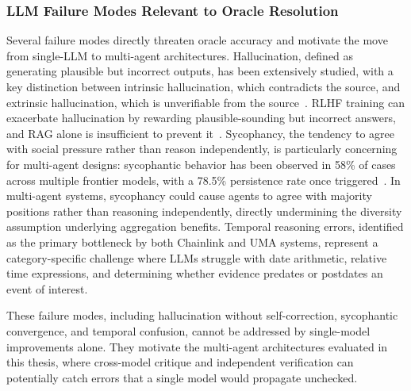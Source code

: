 \subsubsection{LLM Failure Modes Relevant to Oracle Resolution}

Several failure modes directly threaten oracle accuracy and motivate the 
move from single-LLM to multi-agent architectures. Hallucination, 
defined as generating plausible but incorrect outputs, has been extensively 
studied, with a key distinction between intrinsic hallucination, which 
contradicts the source, and extrinsic hallucination, which is unverifiable 
from the source~\cite{ji2023hallucination}. RLHF training can exacerbate 
hallucination by rewarding plausible-sounding but incorrect answers, and 
RAG alone is insufficient to prevent it~\cite{huang2025hallucination}. 
Sycophancy, the tendency to agree with social pressure rather than 
reason independently, is particularly concerning for multi-agent designs: 
sycophantic behavior has been observed in 58\% of cases across multiple 
frontier models, with a 78.5\% persistence rate once 
triggered~\cite{fanous2025sycophancy}. In multi-agent systems, sycophancy 
could cause agents to agree with majority positions rather than reasoning 
independently, directly undermining the diversity assumption underlying 
aggregation benefits. Temporal reasoning errors, identified as the 
primary bottleneck by both Chainlink and UMA systems, represent a 
category-specific challenge where LLMs struggle with date arithmetic, 
relative time expressions, and determining whether evidence predates or 
postdates an event of interest.

These failure modes, including hallucination without self-correction, sycophantic convergence, and temporal confusion, cannot be addressed by single-model improvements alone. They motivate the multi-agent architectures evaluated in this thesis, where cross-model critique and independent verification can potentially catch errors that a single model would propagate unchecked.